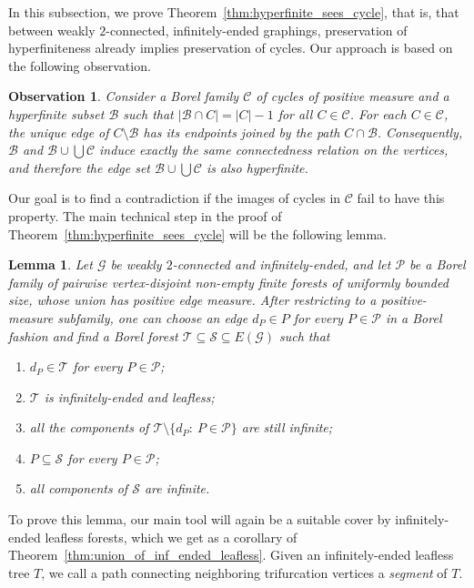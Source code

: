 \documentclass{article}
\theoremstyle{plain}
\newtheorem{lem}[thm]{Lemma}
\newtheorem{obs}[thm]{Observation}
\theoremstyle{definition}
\newcommand{\cB}{\mathcal{B}}
\newcommand{\cG}{\mathcal{G}}
\newcommand{\cS}{\mathcal{S}}
\newcommand{\mC}{\mathscr C}
\newcommand{\cT}{\mathcal{T}}
\begin{document}
In this subsection, we prove Theorem~\ref{thm:hyperfinite_sees_cycle}, that is, that between weakly $2$-connected, infinitely-ended graphings, preservation of hyperfiniteness already implies preservation of cycles. Our approach is based on the following observation.

\begin{obs} \label{obs:cycle_property}
Consider a Borel family $\mC$ of cycles of positive measure and a hyperfinite subset $\cB$ such that $|\cB\cap C|=|C|-1$ for all $C\in\mC$. For each $C\in\mC$, the unique edge of $C\setminus \cB$ has its endpoints joined by the path $C\cap \cB$. Consequently, $\cB$ and $\cB\cup\bigcup\mC$ induce exactly the same connectedness relation on the vertices, and therefore the edge set $\cB\cup\bigcup\mC$ is also hyperfinite.    
\end{obs}

Our goal is to find a contradiction if the images of cycles in $\mC$ fail to have this property. The main technical step in the proof of   Theorem~\ref{thm:hyperfinite_sees_cycle} will be the following lemma.

\begin{lem} \label{lem:construction_step_laci}
Let $\cG$ be weakly $2$-connected and infinitely-ended, and let $\mathscr P$ be a Borel family of pairwise vertex-disjoint non-empty finite forests of uniformly bounded size, whose union has positive edge measure. After restricting to a positive-measure subfamily, one can choose an edge
$d_P\in P$ for every $P\in\mathscr P$ in a Borel fashion and find a Borel forest $\cT \subseteq \cS \subseteq
E(\cG)$ such that 
\begin{enumerate}
    \item $d_P\in \cT$ for every $P\in \mathscr P$;
    \item $\cT$ is infinitely-ended and leafless;
    \item \label{constuction_still_infty}all the components of $\cT\setminus\{d_P:\ P\in \mathscr P\}$ are still infinite;
    \item $P\subseteq \cS$ for every $P\in \mathscr P$;
    \item all components of $\cS$ are infinite.
\end{enumerate}
\end{lem}

To prove this lemma, our main tool will again be a suitable cover by infinitely-ended leafless forests, which we get as a corollary 
of Theorem~\ref{thm:union_of_inf_ended_leafless}. Given an infinitely-ended leafless tree $T$, we call a path connecting neighboring trifurcation vertices a \emph{segment} of
$T$.
\end{document}
